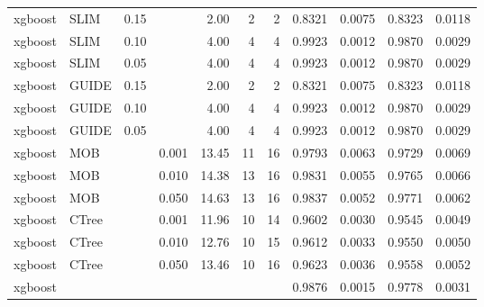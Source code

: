 \begin{table}
\begin{tabular}[t]{l|l|r|r|r|r|r|r|r|r|r}
xgboost & SLIM & 0.15 & & 2.00 & 2 & 2 & 0.8321 & 0.0075 & 0.8323 & 0.0118\\
xgboost & SLIM & 0.10 & & 4.00 & 4 & 4 & 0.9923 & 0.0012 & 0.9870 & 0.0029\\
xgboost & SLIM & 0.05 & & 4.00 & 4 & 4 & 0.9923 & 0.0012 & 0.9870 & 0.0029\\
xgboost & GUIDE & 0.15 & & 2.00 & 2 & 2 & 0.8321 & 0.0075 & 0.8323 & 0.0118\\
xgboost & GUIDE & 0.10 & & 4.00 & 4 & 4 & 0.9923 & 0.0012 & 0.9870 & 0.0029\\
xgboost & GUIDE & 0.05 & & 4.00 & 4 & 4 & 0.9923 & 0.0012 & 0.9870 & 0.0029\\
xgboost & MOB & & 0.001 & 13.45 & 11 & 16 & 0.9793 & 0.0063 & 0.9729 & 0.0069\\
xgboost & MOB & & 0.010 & 14.38 & 13 & 16 & 0.9831 & 0.0055 & 0.9765 & 0.0066\\
xgboost & MOB & & 0.050 & 14.63 & 13 & 16 & 0.9837 & 0.0052 & 0.9771 & 0.0062\\
xgboost & CTree & & 0.001 & 11.96 & 10 & 14 & 0.9602 & 0.0030 & 0.9545 & 0.0049\\
xgboost & CTree & & 0.010 & 12.76 & 10 & 15 & 0.9612 & 0.0033 & 0.9550 & 0.0050\\
xgboost & CTree & & 0.050 & 13.46 & 10 & 16 & 0.9623 & 0.0036 & 0.9558 & 0.0052\\
\hline
xgboost & & & & & & & 0.9876 & 0.0015 & 0.9778 & 0.0031\\
\hline
\end{tabular}
\label{tab:app_linear_abrupt_1000}

\end{table}



